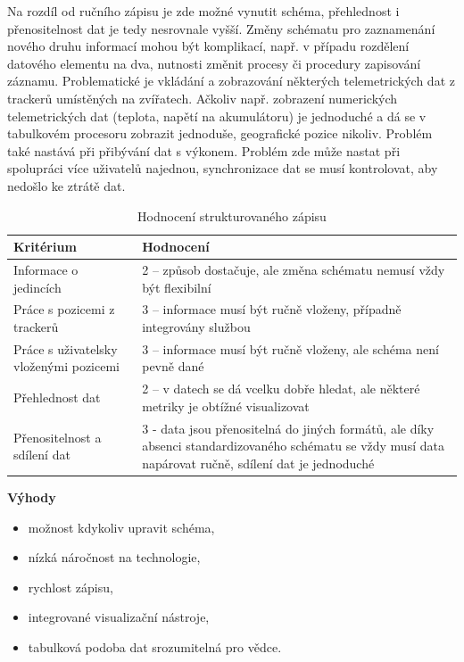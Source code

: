 Na rozdíl od ručního zápisu je zde možné vynutit schéma, přehlednost i přenositelnost dat je tedy nesrovnale vyšší. Změny schématu pro zaznamenání nového druhu informací mohou být komplikací, např. v případu rozdělení datového elementu na dva, nutnosti změnit procesy či procedury zapisování záznamu. Problematické je vkládání a zobrazování některých telemetrických dat z trackerů umístěných na zvířatech. Ačkoliv např. zobrazení numerických telemetrických dat (teplota, napětí na akumulátoru) je jednoduché a dá se v tabulkovém procesoru zobrazit jednoduše, geografické pozice nikoliv. Problém také nastává při přibývání dat s výkonem. Problém zde může nastat při spolupráci více uživatelů najednou, synchronizace dat se musí kontrolovat, aby nedošlo ke ztrátě dat.

\begin{table}[h]
	\begin{tabularx}{\textwidth}{ | X | X | }
		\hline
		Kritérium                              & Hodnocení \\
		\hline			
		Informace o jedincích                  & 2 -- způsob dostačuje, ale změna schématu nemusí vždy být flexibilní          \\
		\hline
		Práce s pozicemi z trackerů            & 3 -- informace musí být ručně vloženy, případně integrovány službou          \\
		\hline
		Práce s uživatelsky vloženými pozicemi & 3 -- informace musí být ručně vloženy, ale schéma není pevně dané          \\
		\hline
		Přehlednost dat                        & 2 -- v datech se dá vcelku dobře hledat, ale některé metriky je obtížné visualizovat          \\
		\hline
		Přenositelnost a sdílení dat           & 3 - data jsou přenositelná do jiných formátů, ale díky absenci standardizovaného schématu se vždy musí data napárovat ručně, sdílení dat je jednoduché          \\
		\hline	
	\end{tabularx}
	\caption{Hodnocení strukturovaného zápisu}
\end{table}

\textbf{Výhody}

\begin{itemize}
	\item možnost kdykoliv upravit schéma,
	\item nízká náročnost na technologie,
	\item rychlost zápisu,
	\item integrované visualizační nástroje,
	\item tabulková podoba dat srozumitelná pro vědce.
\end{itemize}

